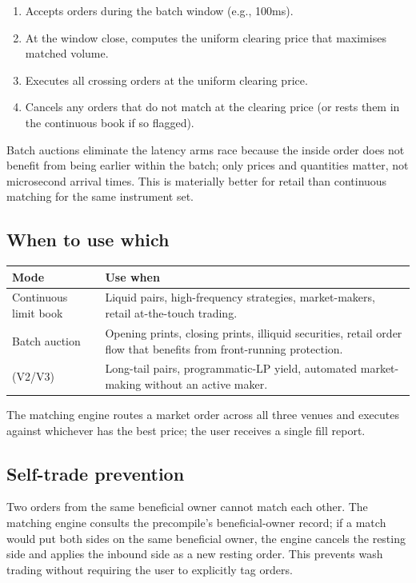 \begin{enumerate}[leftmargin=1.4em]
  \item Accepts orders during the batch window (e.g., 100ms).
  \item At the window close, computes the uniform clearing price
        that maximises matched volume.
  \item Executes all crossing orders at the uniform clearing price.
  \item Cancels any orders that do not match at the clearing price
        (or rests them in the continuous book if so flagged).
\end{enumerate}

Batch auctions eliminate the latency arms race because the inside
order does not benefit from being earlier within the batch; only
prices and quantities matter, not microsecond arrival times. This
is materially better for retail than continuous matching for the
same instrument set.

\subsection{When to use which}

\begin{longtable}{p{}p{}}
\toprule
\textbf{Mode} & \textbf{Use when} \\
\midrule
Continuous limit book & Liquid pairs, high-frequency strategies, market-makers, retail at-the-touch trading. \\
Batch auction & Opening prints, closing prints, illiquid securities, retail order flow that benefits from front-running protection. \\
\AMM{} (V2/V3) & Long-tail pairs, programmatic-LP yield, automated market-making without an active maker. \\
\bottomrule
\end{longtable}

The matching engine routes a market order across all three venues
and executes against whichever has the best price; the user receives
a single fill report.

\subsection{Self-trade prevention}

Two orders from the same beneficial owner cannot match each other.
The matching engine consults the \Liquidity{} precompile's
beneficial-owner record; if a match would put both sides on the same
beneficial owner, the engine cancels the resting side and applies
the inbound side as a new resting order. This prevents wash trading
without requiring the user to explicitly tag orders.

